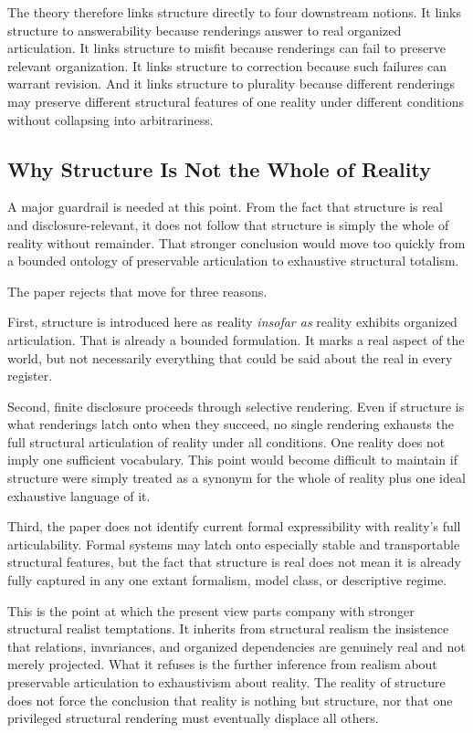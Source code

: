 \documentclass[11pt]{article}
\renewcommand{\emph}[1]{\textit{#1}}
\begin{document}
The theory therefore links structure directly to four downstream notions. It links structure to answerability because renderings answer to real organized articulation. It links structure to misfit because renderings can fail to preserve relevant organization. It links structure to correction because such failures can warrant revision. And it links structure to plurality because different renderings may preserve different structural features of one reality under different conditions without collapsing into arbitrariness.

\subsection{Why Structure Is Not the Whole of Reality}

A major guardrail is needed at this point. From the fact that structure is real and disclosure-relevant, it does not follow that structure is simply the whole of reality without remainder. That stronger conclusion would move too quickly from a bounded ontology of preservable articulation to exhaustive structural totalism.

The paper rejects that move for three reasons.

First, structure is introduced here as reality \emph{insofar as} reality exhibits organized articulation. That is already a bounded formulation. It marks a real aspect of the world, but not necessarily everything that could be said about the real in every register.

Second, finite disclosure proceeds through selective rendering. Even if structure is what renderings latch onto when they succeed, no single rendering exhausts the full structural articulation of reality under all conditions. One reality does not imply one sufficient vocabulary. This point would become difficult to maintain if structure were simply treated as a synonym for the whole of reality plus one ideal exhaustive language of it. \cite{Massimi2022PerspectivalRealism,Ludwig2021ScientificPluralismSEP}

Third, the paper does not identify current formal expressibility with reality's full articulability. Formal systems may latch onto especially stable and transportable structural features, but the fact that structure is real does not mean it is already fully captured in any one extant formalism, model class, or descriptive regime. \cite{Shapiro2000ThinkingAboutMathematics,Cassirer1953SubstanceFunction}

This is the point at which the present view parts company with stronger structural realist temptations. It inherits from structural realism the insistence that relations, invariances, and organized dependencies are genuinely real and not merely projected. What it refuses is the further inference from realism about preservable articulation to exhaustivism about reality. The reality of structure does not force the conclusion that reality is nothing but structure, nor that one privileged structural rendering must eventually displace all others.
\end{document}
